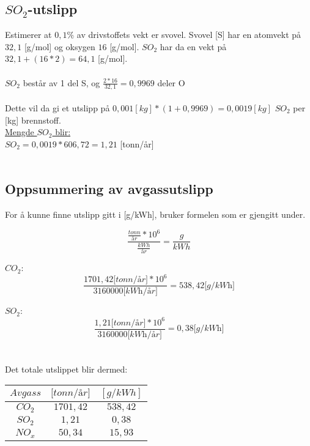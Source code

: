 \documentclass[norsk]{article}
\begin{document}
	\subsection{$SO_2$-utslipp}
Estimerer at $0,1\%$ av drivstoffets vekt er svovel. Svovel [S] har en atomvekt på $32,1$ [g/mol] og oksygen $16$ [g/mol]. $SO_2$ har da en vekt på $32,1 + (16 * 2) = 64,1$ [g/mol].
\\\\
$SO_2$ består av 1 del S, og $\frac{2*16}{32,1} = 0,9969$ deler O
\\\\
Dette vil da gi et utslipp på $0,001[kg] * (1+0,9969) = 0,0019[kg]$ $SO_2$ per [kg] brennstoff.\\
\underline{Mengde $SO_2$ blir:}
\\
$SO_2 = 0,0019 * 606,72 = 1,21$ [tonn/år]
\\\\


	\subsection{Oppsummering av avgassutslipp}
For å kunne finne utslipp gitt i [g/kWh], bruker formelen som er gjengitt under.

\begin{equation}
\frac{\frac{tonn}{\textit{år}}*10^6}{\frac{kWh}{\textit{år}}} = \frac{g}{kWh}
\end{equation}

$CO_2$:
\begin{equation}
\frac{1701,42 \textit{[tonn/år]} * 10^6}{3160000 \textit{[kWh/år]}}= 538,42 \textit{[g/kWh]}
\end{equation}

$SO_2$:
\begin{equation}
\frac{1,21 \textit{[tonn/år]} * 10^6}{3160000 \textit{[kWh/år]}}= 0,38 \textit{[g/kWh]}
\end{equation}
\\\\
Det totale utslippet blir dermed:
\begin{table}[htp]
\centering
\begin{tabular}{c|c|c}
\toprule
\textbf{$Avgass$} & $\textit{[tonn/år]}$ & $[g/kWh]$ \\
\midrule
$CO_2$ & $1701,42$ & $538,42$ \\
$SO_2$ & $1,21$ & $0,38$ \\
$NO_x$ & $50,34$ & $15,93$\\
\bottomrule
\end{tabular}
\end{table}
\end{document}
